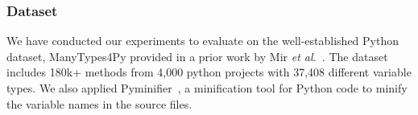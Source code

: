 

\subsubsection{Dataset} We have conducted our experiments to evaluate {\tool} on the
well-established Python dataset, ManyTypes4Py provided in a prior work
by Mir {\em et al.}~\cite{mir2021manytypes4py}. The dataset includes
180k+ methods from 4,000 python projects with 37,408 different
variable types. We also applied Pyminifier~\cite{pyminifier}, a
minification tool for Python code to minify the variable names in 
the source files.

